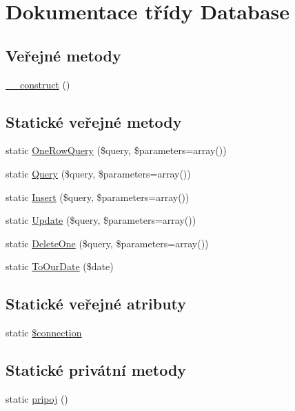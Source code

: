 \hypertarget{class_database}{\section{Dokumentace třídy Database}
\label{class_database}
}
\subsection*{Veřejné metody}
\begin{DoxyCompactItemize}
\item 
\hyperlink{class_database_a2852f635197e76a838486e64e00aac9f}{\-\_\-\-\_\-construct} ()
\end{DoxyCompactItemize}
\subsection*{Statické veřejné metody}
\begin{DoxyCompactItemize}
\item 
static \hyperlink{class_database_a1157c79cc2e8e5a1940c1ecfd82608c2}{One\-Row\-Query} (\$query, \$parameters=array())
\item 
static \hyperlink{class_database_a642336028812c2acb456877d24061a8e}{Query} (\$query, \$parameters=array())
\item 
static \hyperlink{class_database_a54d8af24f74fdfbf623c24884a6a61ab}{Insert} (\$query, \$parameters=array())
\item 
static \hyperlink{class_database_a594755e05aa391f91e3965e3d7f401e2}{Update} (\$query, \$parameters=array())
\item 
static \hyperlink{class_database_a378c729b8dc50a07964df3a2455d6040}{Delete\-One} (\$query, \$parameters=array())
\item 
static \hyperlink{class_database_a67c93de11b18d8fc9667cc7e63f3a014}{To\-Our\-Date} (\$date)
\end{DoxyCompactItemize}
\subsection*{Statické veřejné atributy}
\begin{DoxyCompactItemize}
\item 
static \hyperlink{class_database_a6c6ec1bb30526f5e9a2d5ccfd6dbcc2b}{\$connection}
\end{DoxyCompactItemize}
\subsection*{Statické privátní metody}
\begin{DoxyCompactItemize}
\item 
static \hyperlink{class_database_a49e19ec965f11acb29631e3a613d1bad}{pripoj} ()
\end{DoxyCompactItemize}


